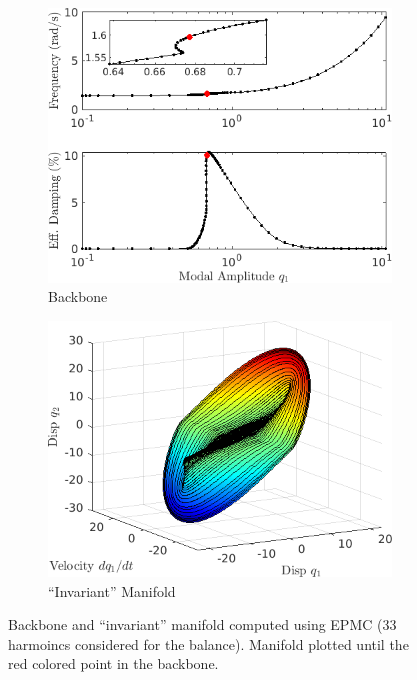 \documentclass[12pt]{article}
\begin{document}
\begin{figure}[!h]
  \centering
  \begin{subfigure}{0.5\textwidth}
    \includegraphics[width=\linewidth]{FIGS/C_EPMCBB_33}
    \caption{Backbone}
  \end{subfigure}%
  \begin{subfigure}{0.5\textwidth}
    \includegraphics[width=\linewidth]{FIGS/C_EPMCIM_33}
    \caption{``Invariant'' Manifold}
  \end{subfigure}
  \caption{Backbone and ``invariant'' manifold computed using EPMC (33
  harmoincs considered for the balance). Manifold plotted until the
  red colored point in the backbone.}
\end{figure}
\end{document}
